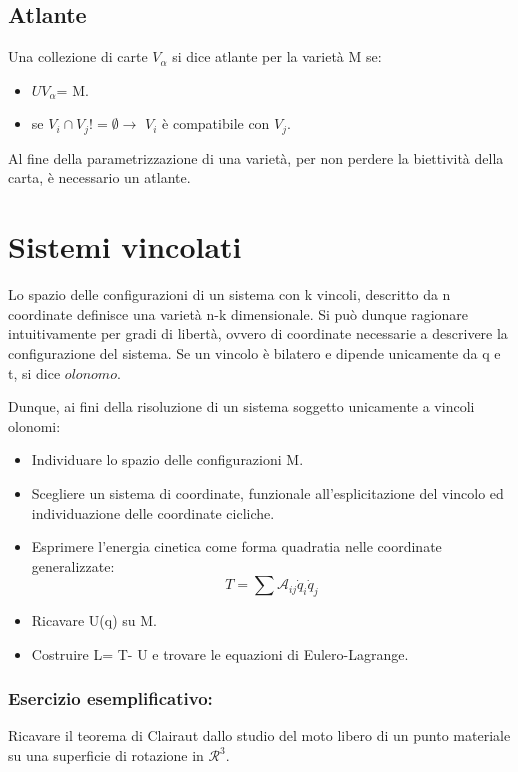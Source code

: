 \documentclass{article}
\begin{document}
            \subsection{Atlante}
            Una collezione di carte $V_\alpha$ si dice atlante per la varietà M se:
            \begin{itemize}
                \item $U V_\alpha$= M.
                \item se $V_i \cap V_j != \emptyset \rightarrow$ $V_i$ è compatibile con $V_j$.
            \end{itemize}
            Al fine della parametrizzazione di una varietà, per non perdere la biettività della carta, è necessario un atlante.

            \section{Sistemi vincolati}
            Lo spazio delle configurazioni di un sistema con k vincoli, descritto da n coordinate definisce una varietà n-k dimensionale. Si può dunque ragionare intuitivamente per gradi di libertà, ovvero di coordinate necessarie a descrivere la configurazione del sistema.
            Se un vincolo è bilatero e dipende unicamente da q e t, si dice $olonomo$.

            Dunque, ai fini della risoluzione di un sistema soggetto unicamente a vincoli olonomi:

            \begin{itemize}
                \item Individuare lo spazio delle configurazioni M.
                \item Scegliere un sistema di coordinate, funzionale all'esplicitazione del vincolo ed individuazione delle coordinate cicliche.
                \item Esprimere l'energia cinetica come forma quadratia nelle coordinate generalizzate:
                      \begin{equation}
                          T= \sum \mathcal{A}_{ij} \dot q_i \dot q_j
                      \end{equation}
                \item Ricavare U(q) su M.
                \item Costruire L= T- U e trovare le equazioni di Eulero-Lagrange.
            \end{itemize}

            \subsubsection{Esercizio esemplificativo:}
            Ricavare il teorema di Clairaut dallo studio del moto libero di un punto materiale su una superficie di rotazione in $\mathcal{R}^3$.
\end{document}

